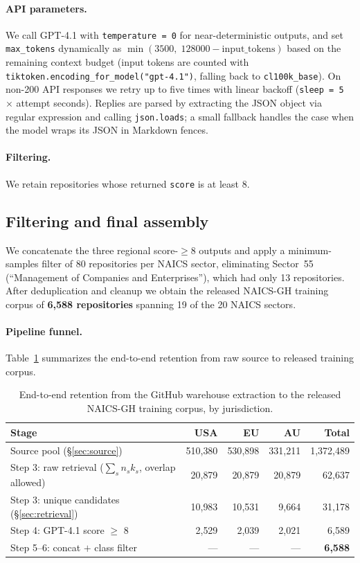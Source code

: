 \documentclass{article}
\begin{document}
\paragraph{API parameters.}
We call GPT-4.1 with \texttt{temperature = 0} for near-deterministic
outputs, and set \texttt{max\_tokens} dynamically as
$\min(3500,\;128000 - \mathrm{input\_tokens})$ based on the remaining
context budget (input tokens are counted with
\texttt{tiktoken.encoding\_for\_model("gpt-4.1")}, falling back to
\texttt{cl100k\_base}). On non-200 API responses we retry up to five
times with linear backoff (\texttt{sleep = 5} $\times$ attempt
seconds). Replies are parsed by extracting the JSON object via regular
expression and calling \texttt{json.loads}; a small fallback handles
the case when the model wraps its JSON in Markdown fences.

\paragraph{Filtering.}
We retain repositories whose returned \texttt{score} is at least 8.

\subsection{Filtering and final assembly}
We concatenate the three regional score-$\geq 8$ outputs and apply a
minimum-samples filter of 80 repositories per NAICS sector,
eliminating Sector~55 (``Management of Companies and Enterprises''),
which had only 13 repositories. After deduplication and cleanup we
obtain the released NAICS-GH training corpus of
\textbf{6{,}588 repositories} spanning 19 of the 20 NAICS sectors.

\paragraph{Pipeline funnel.}
Table~\ref{tab:funnel} summarizes the end-to-end retention from raw
source to released training corpus.

\begin{table}[ht]
\centering
\caption{End-to-end retention from the GitHub warehouse extraction to
the released NAICS-GH training corpus, by jurisdiction.}
\label{tab:funnel}
\small
\begin{tabular}{lrrrr}
\toprule
Stage & USA & EU & AU & Total \\
\midrule
Source pool (\S\ref{sec:source}) & 510{,}380 & 530{,}898 & 331{,}211 & 1{,}372{,}489 \\
Step 3: raw retrieval ($\sum_s n_s k_s$, overlap allowed) & 20{,}879 & 20{,}879 & 20{,}879 & 62{,}637 \\
Step 3: unique candidates (\S\ref{sec:retrieval}) & 10{,}983 & 10{,}531 & 9{,}664 & 31{,}178 \\
Step 4: GPT-4.1 score $\geq$ 8 & 2{,}529 & 2{,}039 & 2{,}021 & 6{,}589 \\
Step 5--6: concat $+$ class filter & --- & --- & --- & \textbf{6{,}588} \\
\bottomrule
\end{tabular}
\end{table}
\end{document}
